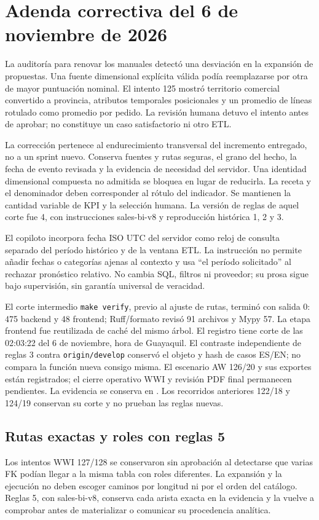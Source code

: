 \documentclass[11pt,letterpaper]{article}
\newcommand{\file}[1]{\texttt{#1}}
\begin{document}
\section{Adenda correctiva del 6 de noviembre de 2026}

La auditoría para renovar los manuales detectó una desviación en la expansión
de propuestas. Una fuente dimensional explícita válida podía reemplazarse por
otra de mayor puntuación nominal. El intento 125 mostró territorio comercial
convertido a provincia, atributos temporales posicionales y un promedio de
líneas rotulado como promedio por pedido. La revisión humana detuvo el intento
antes de aprobar; no constituye un caso satisfactorio ni otro ETL.

La corrección pertenece al endurecimiento transversal del incremento entregado,
no a un sprint nuevo. Conserva fuentes y rutas seguras, el grano del hecho, la
fecha de evento revisada y la evidencia de necesidad del servidor. Una
identidad dimensional compuesta no admitida se bloquea en lugar de reducirla.
La receta y el denominador deben corresponder al rótulo del indicador. Se
mantienen la cantidad variable de KPI y la selección humana. La versión de
reglas de aquel corte fue 4, con instrucciones sales-bi-v8 y reproducción histórica
1, 2 y 3.

El copiloto incorpora fecha ISO UTC del servidor como reloj de consulta separado
del período histórico y de la ventana ETL. La instrucción no permite añadir fechas
o categorías ajenas al contexto y usa ``el período solicitado'' al rechazar
pronóstico relativo. No cambia SQL, filtros ni proveedor; su prosa sigue bajo
supervisión, sin garantía universal de veracidad.

El corte intermedio \file{make verify}, previo al ajuste de rutas, terminó
con salida 0: 475 backend y 48 frontend; Ruff/formato
revisó 91 archivos y Mypy 57. La etapa frontend fue reutilizada de caché del mismo
árbol. El registro  tiene corte de las
02:03:22 del 6 de noviembre, hora de Guayaquil. El contraste independiente de reglas
3 contra \file{origin/develop} conservó el objeto y hash de casos ES/EN; no compara
la función nueva consigo misma. El escenario AW 126/20 y sus exportes están
registrados; el cierre operativo WWI y revisión PDF final permanecen pendientes.
La evidencia se conserva en
. Los recorridos anteriores 122/18 y
124/19 conservan su corte y no prueban las reglas nuevas.

\subsection{Rutas exactas y roles con reglas 5}
Los intentos WWI 127/128 se conservaron sin aprobación al detectarse que varias FK
podían llegar a la misma tabla con roles diferentes. La expansión y la ejecución
no deben escoger caminos por longitud ni por el orden del catálogo. Reglas 5,
con sales-bi-v8, conserva cada arista exacta en la evidencia y la vuelve a comprobar
antes de materializar o comunicar su procedencia analítica.
\end{document}

